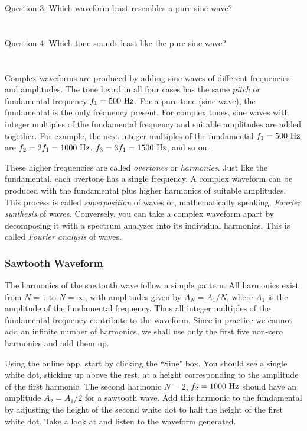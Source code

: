 \documentclass[11pt]{NSF}
\begin{document}
\underline{Question 3}: Which waveform least resembles a pure sine wave?
\\
\\
\\
\underline{Question 4}: Which tone sounds least like the pure sine wave?
\\
\\
\\

Complex waveforms are produced by adding sine waves of different frequencies
and amplitudes. The tone heard in all four cases has the same {\em pitch} or
fundamental frequency $f_1= 500~{\rm Hz}$. For a pure tone (sine wave), the fundamental
is the only frequency present. For complex tones, sine waves with integer
multiples of the fundamental frequency and suitable amplitudes are added
together. For example, the next integer multiples of the fundamental 
$f_1 = 500~{\rm Hz}$ are 
$f_2 = 2 f_1= 1000~{\rm Hz}$, 
$f_3 = 3 f_1 = 1500~{\rm Hz}$, and so on.

These higher frequencies are called {\em overtones} or {\em harmonics}. 
Just like the
fundamental, each overtone has a single frequency. A complex waveform can be
produced with the fundamental plus higher harmonics of suitable amplitudes.
This process is called {\em superposition} of waves or, mathematically speaking,
{\em Fourier synthesis} of waves. Conversely, you can take a complex waveform apart
by decomposing it with a spectrum analyzer into its individual harmonics. This is
called {\em Fourier analysis} of waves.

\subsubsection{Sawtooth Waveform}

The harmonics of the sawtooth wave follow a simple pattern. All harmonics
exist from $N=1$ to $N=\infty$, with amplitudes given by 
$A_N = A_1/N$, where $A_1$ is the amplitude of the fundamental frequency.
Thus all integer multiples of the fundamental frequency
contribute to the waveform. 
Since in practice we cannot add an infinite number
of harmonics, we shall use only the first five non-zero
harmonics and add them up.

Using the online app, start by clicking the ``Sine" box.
You should see a single white dot, sticking up above the rest,
at a height corresponding to the amplitude of the first harmonic.
The second harmonic $N=2$, $f_2=1000~{\rm Hz}$ should have an 
amplitude $A_2=A_1/2$ for a sawtooth wave. 
Add this harmonic to the fundamental by adjusting the height 
of the second white dot to half the height of the first white dot. 
Take a look at and listen to the waveform generated.
\end{document}
